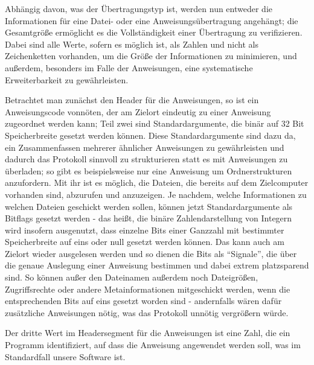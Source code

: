 Abhängig davon, was der Übertragungstyp ist, werden nun entweder die Informationen für eine Datei- oder eine Anweisungsübertragung angehängt; die Gesamtgröße ermöglicht es die Vollständigkeit einer Übertragung zu verifizieren.
Dabei sind alle Werte, sofern es möglich ist, als Zahlen und nicht als Zeichenketten vorhanden, um die Größe der Informationen zu minimieren, und außerdem, besonders im Falle der Anweisungen, eine systematische Erweiterbarkeit zu gewährleisten.\\\par
Betrachtet man zunächst den Header für die Anweisungen, so ist ein Anweisungscode vonnöten, der am Zielort eindeutig zu einer Anweisung zugeordnet werden kann; Teil zwei sind Standardargumente, die binär auf 32 Bit Speicherbreite gesetzt werden können.
Diese Standardargumente sind dazu da, ein Zusammenfassen mehrerer ähnlicher Anweisungen zu gewährleisten und dadurch das Protokoll sinnvoll zu strukturieren statt es mit Anweisungen zu überladen; so gibt es beispielsweise nur eine Anweisung um Ordnerstrukturen anzufordern.  
Mit ihr ist es möglich, die Dateien, die bereits auf dem Zielcomputer vorhanden sind, abzurufen und anzuzeigen. 
Je nachdem, welche Informationen zu welchen Dateien geschickt werden sollen, können jetzt Standardargumente als Bitflags gesetzt werden -  das heißt, die binäre Zahlendarstellung von Integern wird insofern ausgenutzt, dass einzelne Bits einer Ganzzahl mit bestimmter Speicherbreite auf eins oder null gesetzt werden können. Das kann auch am Zielort wieder ausgelesen werden und so dienen die Bits als "`Signale"', die über die genaue Auslegung einer Anweisung bestimmen und dabei extrem platzsparend sind.
So können außer den Datei\-namen außerdem noch Dateigrößen, Zugriffsrechte oder andere Metainformationen mitgeschickt werden, wenn die entsprechenden Bits auf eins gesetzt worden sind - andernfalls wären dafür zusätzliche Anweisungen nötig, was das Protokoll unnötig vergrößern würde.\\\par
Der dritte Wert im Headersegment für die Anweisungen ist eine Zahl, die ein Programm identifiziert, auf dass die Anweisung angewendet werden soll, was im Standardfall unsere Software ist.

